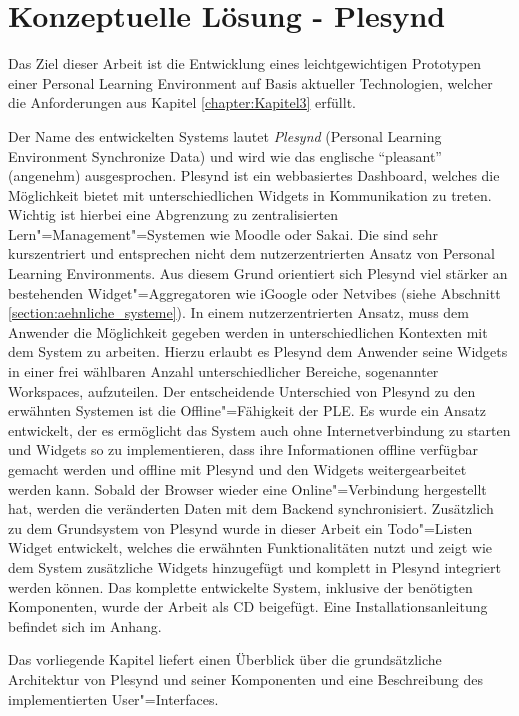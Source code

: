 \chapter{Konzeptuelle Lösung - Plesynd} 
\label{chapter:Kapitel5}
Das Ziel dieser Arbeit ist die Entwicklung eines leichtgewichtigen Prototypen einer Personal Learning Environment auf Basis aktueller Technologien, welcher die Anforderungen aus Kapitel \ref{chapter:Kapitel3} erfüllt. 

Der Name des entwickelten Systems lautet \emph{Plesynd} (Personal Learning Environment Synchronize Data) und wird wie das englische "`pleasant"' (angenehm) ausgesprochen. Plesynd ist ein webbasiertes Dashboard, welches die Möglichkeit bietet mit unterschiedlichen Widgets in Kommunikation zu treten. Wichtig ist hierbei eine Abgrenzung zu zentralisierten Lern"=Management"=Systemen wie Moodle oder Sakai. Die sind sehr kurszentriert und entsprechen nicht dem nutzerzentrierten Ansatz von Personal Learning Environments. Aus diesem Grund orientiert sich Plesynd viel stärker an bestehenden Widget"=Aggregatoren wie iGoogle oder Netvibes (siehe Abschnitt \ref{section:aehnliche_systeme}). In einem nutzerzentrierten Ansatz, muss dem Anwender die Möglichkeit gegeben werden in unterschiedlichen Kontexten mit dem System zu arbeiten. Hierzu erlaubt es Plesynd dem Anwender seine Widgets in einer frei wählbaren Anzahl unterschiedlicher Bereiche, sogenannter Workspaces, aufzuteilen. Der entscheidende Unterschied von Plesynd zu den erwähnten Systemen ist die Offline"=Fähigkeit der PLE. Es wurde ein Ansatz entwickelt, der es ermöglicht das System auch ohne Internetverbindung zu starten und Widgets so zu implementieren, dass ihre Informationen offline verfügbar gemacht werden und offline mit Plesynd und den Widgets weitergearbeitet werden kann. Sobald der Browser wieder eine Online"=Verbindung hergestellt hat, werden die veränderten Daten mit dem Backend synchronisiert. Zusätzlich zu dem Grundsystem von Plesynd wurde in dieser Arbeit ein Todo"=Listen Widget entwickelt, welches die erwähnten Funktionalitäten nutzt und zeigt wie dem System zusätzliche Widgets hinzugefügt und komplett in Plesynd integriert werden können. Das komplette entwickelte System, inklusive der benötigten Komponenten, wurde der Arbeit als CD beigefügt. Eine Installationsanleitung befindet sich im Anhang.

Das vorliegende Kapitel liefert einen Überblick über die grundsätzliche Architektur von Plesynd und seiner Komponenten und eine Beschreibung des implementierten User"=Interfaces.

